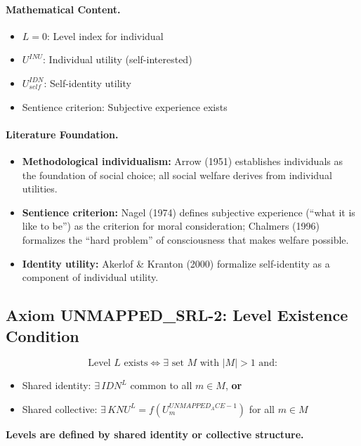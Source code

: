\paragraph{Mathematical Content.}
\begin{itemize}
\item $L = 0$: Level index for individual
\item $U^{INU}$: Individual utility (self-interested)
\item $U^{IDN}_{self}$: Self-identity utility
\item Sentience criterion: Subjective experience exists
\end{itemize}

\paragraph{Literature Foundation.}
\begin{itemize}
\item \textbf{Methodological individualism:} Arrow (1951) establishes individuals as 
the foundation of social choice; all social welfare derives from individual utilities.
\item \textbf{Sentience criterion:} Nagel (1974) defines subjective experience 
(``what it is like to be'') as the criterion for moral consideration; Chalmers (1996) 
formalizes the ``hard problem'' of consciousness that makes welfare possible.
\item \textbf{Identity utility:} Akerlof \& Kranton (2000) formalize self-identity 
as a component of individual utility.
\end{itemize}

\subsection{Axiom UNMAPPED_SRL-2: Level Existence Condition}

\begin{tcolorbox}[colback=gray!5!white, colframe=gray!75!black, title=Axiom UNMAPPED_SRL-2: Level Existence]
\begin{equation}
\boxed{
\text{Level } L \text{ exists} \iff \exists \text{ set } M \text{ with } |M| > 1 \text{ and:}
}
\end{equation}
\begin{itemize}
\item[(a)] Shared identity: $\exists \, IDN^L$ common to all $m \in M$, \textbf{or}
\item[(b)] Shared collective: $\exists \, KNU^L = f(U^{UNMAPPED_ACE-1}_m)$ for all $m \in M$
\end{itemize}
\textbf{Levels are defined by shared identity or collective structure.}
\end{tcolorbox}

